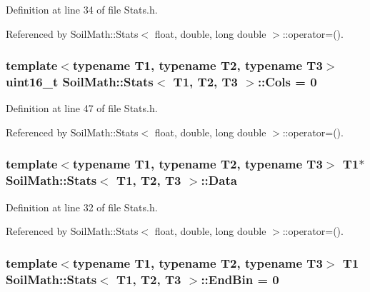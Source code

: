 Definition at line 34 of file Stats.\+h.



Referenced by Soil\+Math\+::\+Stats$<$ float, double, long double $>$\+::operator=().

\hypertarget{class_soil_math_1_1_stats_a971f1ec23c32137805c4577f05454d83}{}
\subsubsection[{Cols}]{\setlength{\rightskip}{0pt plus 5cm}template$<$typename T1, typename T2, typename T3$>$ uint16\+\_\+t {\bf Soil\+Math\+::\+Stats}$<$ T1, T2, T3 $>$\+::Cols = 0}\label{class_soil_math_1_1_stats_a971f1ec23c32137805c4577f05454d83}


Definition at line 47 of file Stats.\+h.



Referenced by Soil\+Math\+::\+Stats$<$ float, double, long double $>$\+::operator=().

\hypertarget{class_soil_math_1_1_stats_affce366ceab8419a3f732e3c3a358f65}{}
\subsubsection[{Data}]{\setlength{\rightskip}{0pt plus 5cm}template$<$typename T1, typename T2, typename T3$>$ T1$\ast$ {\bf Soil\+Math\+::\+Stats}$<$ T1, T2, T3 $>$\+::Data}\label{class_soil_math_1_1_stats_affce366ceab8419a3f732e3c3a358f65}


Definition at line 32 of file Stats.\+h.



Referenced by Soil\+Math\+::\+Stats$<$ float, double, long double $>$\+::operator=().

\hypertarget{class_soil_math_1_1_stats_a0db07157ff238d0d40c4e1f4d67afd46}{}
\subsubsection[{End\+Bin}]{\setlength{\rightskip}{0pt plus 5cm}template$<$typename T1, typename T2, typename T3$>$ T1 {\bf Soil\+Math\+::\+Stats}$<$ T1, T2, T3 $>$\+::End\+Bin = 0}\label{class_soil_math_1_1_stats_a0db07157ff238d0d40c4e1f4d67afd46}


